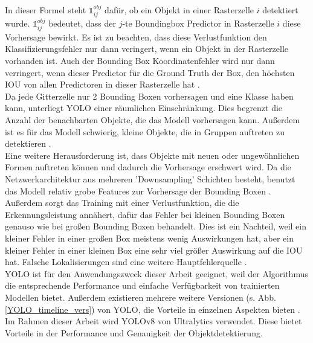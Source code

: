 {{\begin{figure}[h]
		\label{YOLO_loss_function_detail}
 	\end{figure} In dieser Formel steht $\mathbb{1}_{i j}^{obj}$ dafür, ob ein Objekt in einer Rasterzelle $i$ detektiert wurde. $\mathbb{1}_{i j}^{obj}$ bedeutet, dass der $j$-te Boundingbox Predictor in Rasterzelle $i$ diese Vorhersage bewirkt. Es ist zu beachten, dass diese Verlustfunktion den Klassifizierungsfehler nur dann veringert, wenn ein Objekt in der Rasterzelle vorhanden ist. Auch der Bounding Box Koordinatenfehler wird nur dann verringert, wenn dieser Predictor für die Ground Truth der Box, den höchsten IOU von allen Predictoren in dieser Rasterzelle hat \citep{Plastiras2018}. \\
	Da jede Gitterzelle nur 2 Bounding Boxen vorhersagen und eine Klasse haben kann, unterliegt YOLO einer räumlichen Einschränkung. Dies begrenzt die Anzahl der benachbarten Objekte, die das Modell vorhersagen kann. Außerdem ist es für das Modell schwierig, kleine Objekte, die in Gruppen auftreten zu detektieren \citep{Plastiras2018}. \\
	Eine weitere Herausforderung ist, dass Objekte mit neuen oder ungewöhnlichen Formen auftreten können und dadurch die Vorhersage erschwert wird. Da die Netzwerkarchitektur aus mehreren 'Downsampling' Schichten besteht, benutzt das Modell relativ grobe Features zur Vorhersage der Bounding Boxen \citep{Plastiras2018}. \\
	Außerdem sorgt das Training mit einer Verlustfunktion, die die Erkennungsleistung annähert, dafür das Fehler bei kleinen Bounding Boxen genauso wie bei großen Bounding Boxen behandelt. Dies ist ein Nachteil, weil ein kleiner Fehler in einer großen Box meistens wenig Auswirkungen hat, aber ein kleiner Fehler in einer kleinen Box eine sehr viel größer Auswirkung auf die IOU hat. Falsche Lokalisierungen sind eine weitere Hauptfehlerquelle \citep{Plastiras2018}. \\
	YOLO ist für den Anwendungszweck dieser Arbeit geeignet, weil der Algorithmus die entsprechende Performance und einfache Verfügbarkeit von trainierten Modellen bietet. Außerdem existieren mehrere weitere Versionen (s. Abb. \ref{YOLO_timeline_vers}) von YOLO, die Vorteile in einzelnen Aspekten bieten \citep{Terven2023}. \\

	Im Rahmen dieser Arbeit wird YOLOv8 von Ultralytics verwendet. Diese bietet Vorteile in der Performance und Genauigkeit der Objektdetektierung.
	} 

}
